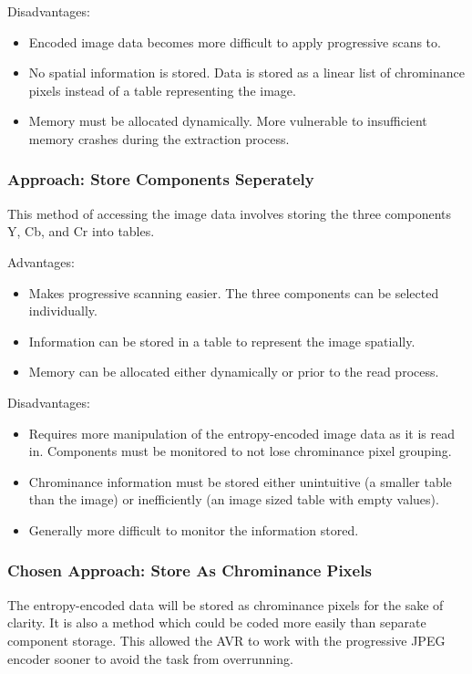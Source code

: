 Disadvantages:
\begin{itemize}
	\item Encoded image data becomes more 
		difficult to apply progressive scans to.
	\item No spatial information is stored. 
		Data is stored as a linear list of chrominance 
		pixels instead of a table representing the image.
	\item Memory must be allocated dynamically. 
		More vulnerable to insufficient memory 
		crashes during the extraction process.
\end{itemize}

\subsubsection{Approach: Store Components Seperately}

This method of accessing the image data involves 
storing the three components Y, Cb, and Cr into tables.

Advantages:
\begin{itemize}
	\item Makes progressive scanning easier. 
		The three components can be selected individually.
	\item Information can be stored in a table to 
		represent the image spatially.
	\item Memory can be allocated either 
		dynamically or prior to the read process.
\end{itemize}

Disadvantages:
\begin{itemize}
	\item Requires more manipulation of the 
		entropy-encoded image data as it is read in. 
		Components must be monitored to not 
		lose chrominance pixel grouping.
	\item Chrominance information must be stored either 
		unintuitive (a smaller table than the image) or 
		inefficiently (an image sized table with empty values).
	\item Generally more difficult to monitor the information stored.
\end{itemize}

\subsubsection{Chosen Approach: Store As Chrominance Pixels}

The entropy-encoded data will be stored as chrominance 
pixels for the sake of clarity. 
It is also a method which could be coded more easily 
than separate component storage. 
This allowed the AVR to work with the progressive 
JPEG encoder sooner to avoid the task from overrunning.